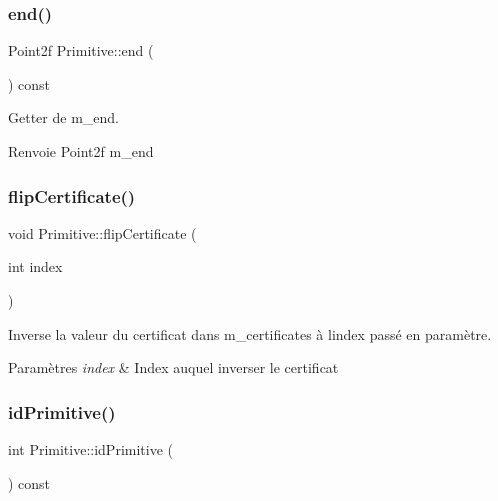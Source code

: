 \subsubsection{\texorpdfstring{end()}{end()}}
{\footnotesize\ttfamily Point2f Primitive\+::end (\begin{DoxyParamCaption}{ }\end{DoxyParamCaption}) const}



Getter de m\+\_\+end. 

\begin{DoxyReturn}{Renvoie}
Point2f m\+\_\+end 
\end{DoxyReturn}
\mbox{\label{classPrimitive_ac488e2f817127865f9bb8c0563012f43}} 
\subsubsection{\texorpdfstring{flip\+Certificate()}{flipCertificate()}}
{\footnotesize\ttfamily void Primitive\+::flip\+Certificate (\begin{DoxyParamCaption}\item[{int}]{index }\end{DoxyParamCaption})}



Inverse la valeur du certificat dans m\+\_\+certificates à l\textquotesingle{}index passé en paramètre. 


\begin{DoxyParams}{Paramètres}
{\em index} & Index auquel inverser le certificat \\
\hline
\end{DoxyParams}
\mbox{\label{classPrimitive_a7e4c88deefa351711897d2522333c530}} 
\subsubsection{\texorpdfstring{id\+Primitive()}{idPrimitive()}}
{\footnotesize\ttfamily int Primitive\+::id\+Primitive (\begin{DoxyParamCaption}{ }\end{DoxyParamCaption}) const}



